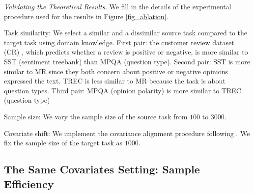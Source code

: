 \textit{Validating the Theoretical Results.}
We fill in the details of the experimental procedure used for the results in Figure \ref{fig_ablation}.
\squishlist
	\item Task similarity: We select a similar and a dissimilar source task compared to the target task using domain knowledge.
First pair: the customer review dataset (CR) , which predicts whether a review is positive or negative, is more similar to SST (sentiment treebank) than MPQA (question type).
Second pair: SST is more similar to MR since they both concern about positive or negative opinions expressed the text.
TREC is less similar to MR because the task is about question types.
Third pair: MPQA (opinion polarity) is more similar to TREC (question type)
	\item Sample size: We vary the sample size of the source task from $100$ to $3000$.
	\item Covariate shift: We implement the covariance alignment procedure following \cite{WZR20}.
	We fix the sample size of the target task as $1000$.
\squishend


\subsection{The Same Covariates Setting: Sample Efficiency}

